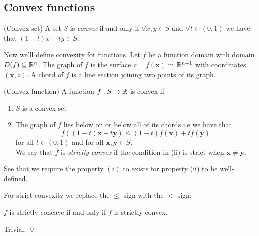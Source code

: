 \documentclass{article}
\begin{document}
\subsection{Convex functions}
\begin{definition}
	(Convex set) A set $ S $ is \textit{convex} if and only if $ \forall x,y\in S $ and $ \forall t\in (0,1) $ we have that $ (1-t)x+ty\in S $.
\end{definition}
Now we'll define convexity for functions. Let $ f $ be a function domain with domain $ D(f)\subseteq \mathbb{R}^n  $. The graph of $ f $ is the surface $ z=f(\mathbf x) $ in $ \mathbb{R}^{n+1} $ with coordinates $ (\mathbf x,z) $. A chord of $ f $ is a line section joining two points of its graph.
\begin{definition}
	(Convex function) A function $ f:S\to \mathbb{R} $ is convex if
	\begin{enumerate}
		\item $ S $ is a convex set
		\item The graph of $ f $ lies below on or below all of its chords i.e we have that
			\[
			  f((1-t)\mathbf x + t\mathbf y)\le (1-t)f(\mathbf x)+tf(\mathbf y)
			\]
			for all $ t\in (0,1) $ and for all $ \mathbf x, \mathbf y \in S $.\\
			We say that $ f $ is \textit{strictly convex} if the condition in (ii) is strict when $ \mathbf x\ne \mathbf y $.
	\end{enumerate}
\end{definition}
\begin{remark}
See that we require the property $ (i) $ to exists for property (ii) to be well-defined.
\end{remark}
For strict convexity we replace the $ \le $ sign with the $ < $ sign.
\begin{lemma}
  $ f $ is strictly concave if and only if $ f $ is strictly convex.
\end{lemma}
\pf Trivial. \qed
\end{document}
